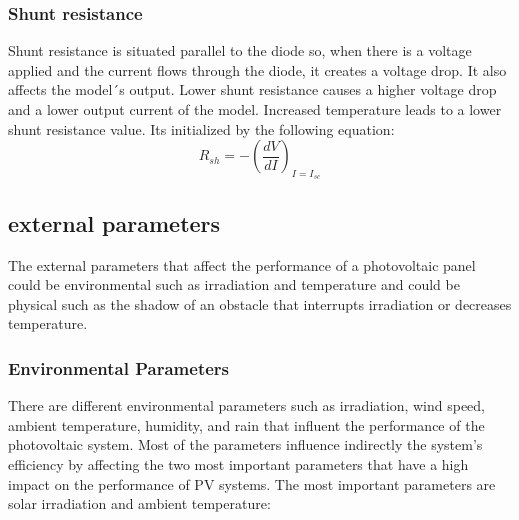 \documentclass{report}
\begin{document}
\subsubsection{Shunt resistance}
Shunt resistance is situated parallel to the diode so, when there is a voltage applied and the current flows through the diode, it creates a voltage drop. It also affects the model´s output. Lower shunt resistance causes a higher voltage drop and a lower output current of the model. Increased temperature leads to a lower shunt resistance value. Its initialized by the following equation:
\begin{equation}
R_{sh} = -\left( \frac{dV}{dI} \right)_{I=I_{sc}}
\end{equation}

\subsection{external parameters}
The external parameters that affect the performance of a photovoltaic panel could be environmental such as irradiation and temperature and could be physical such as the shadow of an obstacle that interrupts irradiation or decreases temperature.

\subsubsection{Environmental Parameters}
There are different environmental parameters such as irradiation, wind speed, ambient temperature, humidity, and rain that influent the performance of the photovoltaic system. Most of the parameters influence indirectly the system's efficiency by affecting the two most important parameters that have a high impact on the performance of PV systems. The most important parameters are solar irradiation and ambient temperature:
\end{document}
